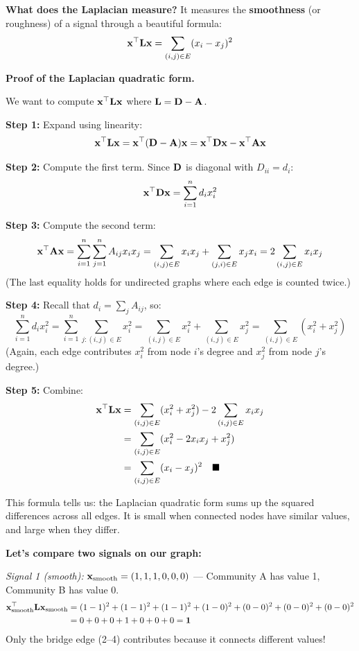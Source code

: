 \begin{notechapter}
\begin{example}
\textbf{What does the Laplacian measure?} It measures the \textbf{smoothness} (or roughness) of a signal through a beautiful formula:
\[
\mathbf{x}^\top \mathbf{L} \mathbf{x} = \sum_{(i,j) \in E} (x_i - x_j)^2
\]

\begin{mathbox}
\textbf{Proof of the Laplacian quadratic form.}

We want to compute $\mathbf{x}^\top \mathbf{L} \mathbf{x}$ where $\mathbf{L} = \mathbf{D} - \mathbf{A}$.

\textbf{Step 1:} Expand using linearity:
\[
\mathbf{x}^\top \mathbf{L} \mathbf{x} = \mathbf{x}^\top (\mathbf{D} - \mathbf{A}) \mathbf{x} = \mathbf{x}^\top \mathbf{D} \mathbf{x} - \mathbf{x}^\top \mathbf{A} \mathbf{x}
\]

\textbf{Step 2:} Compute the first term. Since $\mathbf{D}$ is diagonal with $D_{ii} = d_i$:
\[
\mathbf{x}^\top \mathbf{D} \mathbf{x} = \sum_{i=1}^{n} d_i x_i^2
\]

\textbf{Step 3:} Compute the second term:
\[
\mathbf{x}^\top \mathbf{A} \mathbf{x} = \sum_{i=1}^{n} \sum_{j=1}^{n} A_{ij} x_i x_j = \sum_{(i,j) \in E} x_i x_j + \sum_{(j,i) \in E} x_j x_i = 2\sum_{(i,j) \in E} x_i x_j
\]
(The last equality holds for undirected graphs where each edge is counted twice.)

\textbf{Step 4:} Recall that $d_i = \sum_j A_{ij}$, so:
\[
\sum_{i=1}^{n} d_i x_i^2 = \sum_{i=1}^{n} \sum_{j: (i,j) \in E} x_i^2 = \sum_{(i,j) \in E} x_i^2 + \sum_{(i,j) \in E} x_j^2 = \sum_{(i,j) \in E} (x_i^2 + x_j^2)
\]
(Again, each edge contributes $x_i^2$ from node $i$'s degree and $x_j^2$ from node $j$'s degree.)

\textbf{Step 5:} Combine:
\begin{align*}
\mathbf{x}^\top \mathbf{L} \mathbf{x} &= \sum_{(i,j) \in E} (x_i^2 + x_j^2) - 2\sum_{(i,j) \in E} x_i x_j \\
&= \sum_{(i,j) \in E} (x_i^2 - 2x_i x_j + x_j^2) \\
&= \sum_{(i,j) \in E} (x_i - x_j)^2 \quad \blacksquare
\end{align*}
\end{mathbox}

This formula tells us: the Laplacian quadratic form sums up the squared differences across all edges. It is small when connected nodes have similar values, and large when they differ.

\textbf{Let's compare two signals on our graph:}

\textit{Signal 1 (smooth):} $\mathbf{x}_{\text{smooth}} = (1, 1, 1, 0, 0, 0)$ --- Community A has value 1, Community B has value 0.
\begin{align*}
\mathbf{x}_{\text{smooth}}^\top \mathbf{L} \mathbf{x}_{\text{smooth}} &= (1-1)^2 + (1-1)^2 + (1-1)^2 + (1-0)^2 + (0-0)^2 + (0-0)^2 + (0-0)^2 \\
&= 0 + 0 + 0 + 1 + 0 + 0 + 0 = \mathbf{1}
\end{align*}
Only the bridge edge (2--4) contributes because it connects different values!


\end{example}
\end{notechapter}
